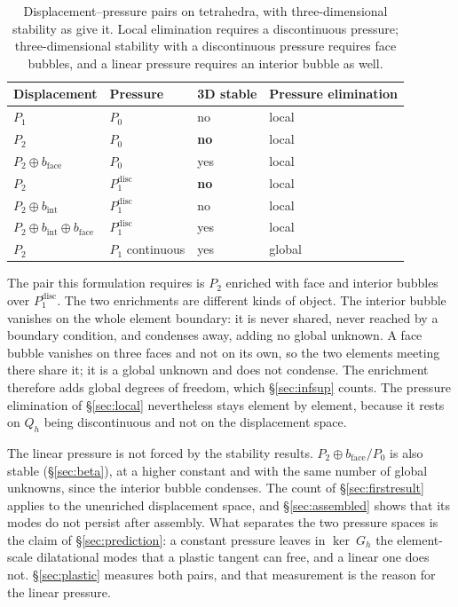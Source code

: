 \documentclass[11pt]{article}
\theoremstyle{definition}
\theoremstyle{plain}
\begin{document}
\begin{table}[h]
\centering
\begin{tabular}{@{}llll@{}}
\toprule
Displacement & Pressure & 3D stable & Pressure elimination \\
\midrule
$P_1$                        & $P_0$                   & no  & local \\
$P_2$                        & $P_0$                   & \textbf{no} & local \\
$P_2 \oplus b_{\mathrm{face}}$ & $P_0$                 & yes & local \\
$P_2$                        & $P_1^{\mathrm{disc}}$   & \textbf{no} & local \\
$P_2 \oplus b_{\mathrm{int}}$ & $P_1^{\mathrm{disc}}$  & no  & local \\
$P_2 \oplus b_{\mathrm{int}} \oplus b_{\mathrm{face}}$ & $P_1^{\mathrm{disc}}$ & yes & local \\
$P_2$                        & $P_1$ continuous        & yes & global \\
\bottomrule
\end{tabular}
\caption{Displacement--pressure pairs on tetrahedra, with three-dimensional
stability as \citet[\S8.7, Example~8.7.2]{BoffiBrezziFortin:2013} give it.
Local elimination
requires a discontinuous pressure; three-dimensional stability with a
discontinuous pressure requires face bubbles, and a linear pressure requires
an interior bubble as well.}
\label{tab:pairs}
\end{table}

The pair this formulation requires is $P_2$ enriched with face and
interior bubbles over $P_1^{\mathrm{disc}}$. The two enrichments are different
kinds of object. The interior bubble vanishes on the whole element boundary: it is never shared,
never reached by a boundary condition, and condenses away, adding no global
unknown. A face bubble vanishes on three faces and not on its own, so the two
elements meeting there share it; it is a global unknown and does not condense.
The enrichment therefore adds global degrees of freedom, which
\S\ref{sec:infsup} counts. The pressure elimination of \S\ref{sec:local}
nevertheless stays element by element, because it rests on $Q_h$ being
discontinuous and not on the displacement space.

The linear pressure is not forced by the stability results. $P_2 \oplus
b_{\mathrm{face}}/P_0$ is also stable (\S\ref{sec:beta}), at a higher constant
and with the same number of global unknowns, since the interior bubble condenses. The count
of \S\ref{sec:firstresult} applies to the unenriched displacement space, and
\S\ref{sec:assembled} shows that its modes do not persist after assembly. What
separates the two pressure spaces is the claim of
\S\ref{sec:prediction}: a constant pressure leaves in $\ker ~G_h$ the
element-scale dilatational modes that a plastic tangent can free, and a linear
one does not. \S\ref{sec:plastic} measures both pairs, and that measurement
is the reason for the linear pressure.
\end{document}
